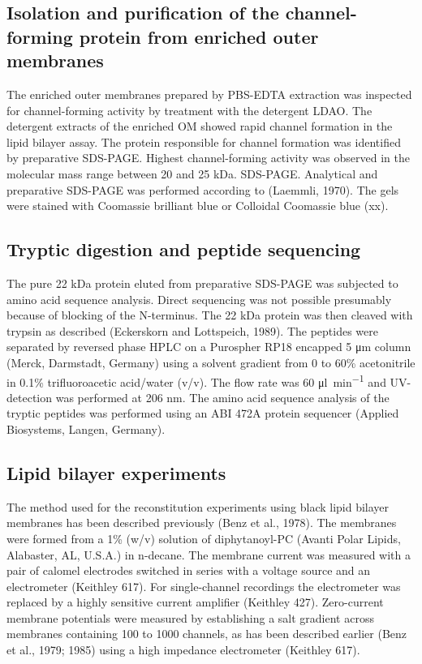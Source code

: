 \subsection{Isolation and purification of the channel-forming protein from enriched outer membranes}
\label{sub:porin_isolation}
The enriched outer membranes prepared by \ac{PBS}-\ac{EDTA} extraction was inspected for channel-forming activity by treatment with the detergent \ac{LDAO}. The detergent extracts of the enriched OM showed rapid channel formation in the lipid bilayer assay. The protein responsible for channel formation was identified by preparative \ac{SDS-PAGE}. Highest channel-forming activity was observed in the molecular mass range between 20 and 25 kDa.
\ac{SDS-PAGE}. 
Analytical and preparative \ac{SDS-PAGE} was performed according to (Laemmli, 1970). The gels were stained with Coomassie brilliant blue or Colloidal Coomassie blue (xx).

\subsection{Tryptic digestion and peptide sequencing}
\label{sub:porin_tryptic}
The pure 22 kDa protein eluted from preparative \ac{SDS-PAGE} was subjected to amino acid sequence analysis. Direct sequencing was not possible presumably because of blocking of the N-terminus. The 22 kDa protein was then cleaved with trypsin as described (Eckerskorn and Lottspeich, 1989). The peptides were separated by reversed phase HPLC on a Purospher RP18 encapped 5 \si{\micro\metre} column (Merck, Darmstadt, Germany) using a solvent gradient from 0 to 60\% acetonitrile in 0.1\% trifluoroacetic acid/water (v/v). The flow rate was 60 \si{\micro\litre\per\minute} and UV-detection was performed at 206 \si{\nano\metre}. The amino acid sequence analysis of the tryptic peptides was performed using an ABI 472A protein sequencer (Applied Biosystems, Langen, Germany).

\subsection{Lipid bilayer experiments}
\label{sub:porin_bilayer}
The method used for the reconstitution experiments using black lipid bilayer membranes has been described previously (Benz et al., 1978). The membranes were formed from a 1\% (w/v) solution of diphytanoyl-\ac{PC} (Avanti Polar Lipids, Alabaster, AL, U.S.A.) in n-decane. The membrane current was measured with a pair of calomel electrodes switched in series with a voltage source and an electrometer (Keithley 617). For single-channel recordings the electrometer was replaced by a highly sensitive current amplifier (Keithley 427). Zero-current membrane potentials were measured by establishing a salt gradient across membranes containing 100 to 1000 channels, as has been described earlier (Benz et al., 1979; 1985) using a high impedance electrometer (Keithley 617).

